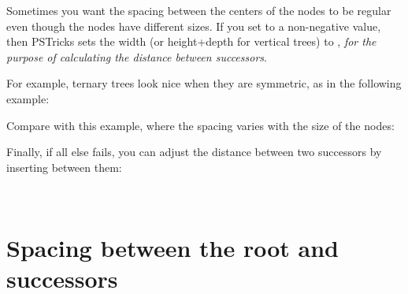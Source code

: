 \documentclass[11pt,english,BCOR10mm,DIV12,bibliography=totoc,parskip=false,smallheadings
    headexclude,footexclude,oneside]{pst-doc}
\begin{document}

Sometimes you want the spacing between the centers of the nodes to be regular
even though the nodes have different sizes. If you set 
to a non-negative value, then PSTricks sets the width (or height+depth for
vertical trees) to , \emph{for the purpose of calculating the
distance between successors}.


For example, ternary trees look nice when they are symmetric, as in the
following example:

\begin{LTXexample}[pos=l,width=0.4\linewidth]
\end{LTXexample}

Compare with this example, where the spacing varies with the size of the
nodes:

\begin{LTXexample}[pos=l,width=0.4\linewidth]
\end{LTXexample}

Finally, if all else fails, you can adjust the distance between two successors 
by inserting  between them:

\begin{LTXexample}[pos=l,width=0.4\linewidth]
\psTree{\Tc{3pt}}\\
\endpsTree
\end{LTXexample}




\section{Spacing between the root and successors}
\end{document}
